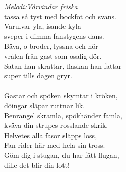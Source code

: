 {\footnotesize\textit{Melodi:Vårvindar friska}}\\
\vspace{10pt}
tassa så tyst med bockfot och svans.\\
Varulvar yla, isande kyla\\
sveper i dimma fanstygens dans.\\
Bäva, o broder, lyssna och hör\\
vrålen från gast som osalig dör.\\
Satan han skrattar, flaskan han fattar\\
super tills dagen gryr.\\
\\
Gastar och spöken skymtar i kröken,\\
döingar släpar ruttnar lik.\\
Benrangel skramla, spökhänder famla,\\
kväva din strupes rosslande skrik.\\
Helvetes alla fasor släpps loss,\\
Fan rider här med hela sin tross.\\
Göm dig i stugan, du har fått flugan,\\
dille det blir din lott!